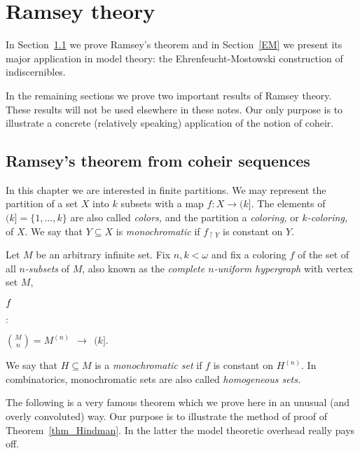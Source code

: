 \chapter{Ramsey theory}
\label{ramsey}

In Section~\ref{Ramsey} we prove Ramsey's theorem and in Section~\ref{EM} we present its major application in model theory: 
the Ehrenfeucht-Mostowski construction of indiscernibles.

In the remaining sections we prove two important results of Ramsey theory.
These results will not be used elsewhere in these notes.
Our only purpose is to illustrate a concrete (relatively speaking) application of the notion of coheir.

\def\medrel#1{\parbox[t]{6ex}{$\displaystyle\hfil #1$}}
\def\ceq#1#2#3{\parbox[t]{12ex}{$\displaystyle #1$}\medrel{#2}{$\displaystyle #3$}}

\section{Ramsey's theorem from coheir sequences}
\label{Ramsey}

In this chapter we are interested in finite partitions.
We may represent the partition of a set $X$ into $k$ subsets with a map $f:X\to (k]$.
The elements of $(k]=\{1,\dots,k\}$ are also called \emph{colors,}
and the partition a \emph{coloring,}
or \emph{$k$-coloring,} of $X$.
We say that $Y\subseteq X$ is \emph{monochromatic\/} if $f_{\restriction Y}$ is constant on $Y$.

Let $M$ be an arbitrary infinite set.
Fix $n,k<\omega$ and fix a coloring $f$ of the set of all \emph{$n$-subsets} of $M$,
also known as the \emph{complete $n$-uniform hypergraph\/} with vertex set $M$,

\ceq{\hfill f}{:}{ \binom{M}{n}=M^{(n)}\ \ \to\ \ (k]}.

We say that $H\subseteq M$ is a \emph{monochromatic set\/} if $f$ is constant on $H^{(n)}$.
In combinatorics, monochromatic sets are also called \emph{homogeneous sets.}

The following is a very famous theorem which we prove here in an unusual (and overly convoluted)  way.
Our purpose is to illustrate the method of proof of Theorem~\ref{thm_Hindman}.
In the latter the model theoretic overhead really pays off.

